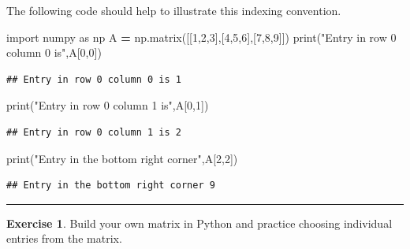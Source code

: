 \documentclass[
]{book}
\newenvironment{Shaded}{\begin{snugshade}}{\end{snugshade}}
\newcommand{\BuiltInTok}[1]{#1}
\newcommand{\DecValTok}[1]{\textcolor[rgb]{0.00,0.00,0.81}{#1}}
\newcommand{\ImportTok}[1]{#1}
\newcommand{\NormalTok}[1]{#1}
\newcommand{\OperatorTok}[1]{\textcolor[rgb]{0.81,0.36,0.00}{\textbf{#1}}}
\newcommand{\StringTok}[1]{\textcolor[rgb]{0.31,0.60,0.02}{#1}}
\theoremstyle{definition}
\theoremstyle{definition}
\theoremstyle{definition}
\newtheorem{exercise}{Exercise}[chapter]
\theoremstyle{remark}
\begin{document}
The following code should help to illustrate this indexing convention.

\begin{Shaded}
\begin{Highlighting}[]
\ImportTok{import}\NormalTok{ numpy }\ImportTok{as}\NormalTok{ np}
\NormalTok{A }\OperatorTok{=}\NormalTok{ np.matrix([[}\DecValTok{1}\NormalTok{,}\DecValTok{2}\NormalTok{,}\DecValTok{3}\NormalTok{],[}\DecValTok{4}\NormalTok{,}\DecValTok{5}\NormalTok{,}\DecValTok{6}\NormalTok{],[}\DecValTok{7}\NormalTok{,}\DecValTok{8}\NormalTok{,}\DecValTok{9}\NormalTok{]])}
\BuiltInTok{print}\NormalTok{(}\StringTok{"Entry in row 0 column 0 is"}\NormalTok{,A[}\DecValTok{0}\NormalTok{,}\DecValTok{0}\NormalTok{])}
\end{Highlighting}
\end{Shaded}

\begin{verbatim}
## Entry in row 0 column 0 is 1
\end{verbatim}

\begin{Shaded}
\begin{Highlighting}[]
\BuiltInTok{print}\NormalTok{(}\StringTok{"Entry in row 0 column 1 is"}\NormalTok{,A[}\DecValTok{0}\NormalTok{,}\DecValTok{1}\NormalTok{])}
\end{Highlighting}
\end{Shaded}

\begin{verbatim}
## Entry in row 0 column 1 is 2
\end{verbatim}

\begin{Shaded}
\begin{Highlighting}[]
\BuiltInTok{print}\NormalTok{(}\StringTok{"Entry in the bottom right corner"}\NormalTok{,A[}\DecValTok{2}\NormalTok{,}\DecValTok{2}\NormalTok{])}
\end{Highlighting}
\end{Shaded}

\begin{verbatim}
## Entry in the bottom right corner 9
\end{verbatim}

\begin{center}\rule{0.5\linewidth}{0.5pt}\end{center}

\begin{exercise}
\protect\hypertarget{exr:unnamed-chunk-284}{}{\label{exr:unnamed-chunk-284} }Build your own matrix in Python and practice choosing individual entries from the matrix.
\end{exercise}
\end{document}
